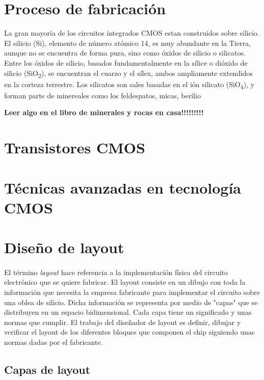\documentclass[12pt,a4paper,oneside,titlepage]{report}
\begin{document}
\section{Proceso de fabricación}

La gran mayoría de los circuitos integrados CMOS estan construidos sobre silicio.
El silicio (Si), elemento de número atómico 14, es muy abundante en la Tierra, aunque
no se encuentra de forma pura, sino como óxidos de silicio o silicatos. Entre los
óxidos de silicio, basados fundamentalmente en la sílice o dióxido de silicio
(SiO\textsubscript{2}), se encuentran el cuarzo y el sílex, ambos ampliamente extendidos
en la corteza terrestre. Los silicatos son sales basadas en el ión silicato (SiO\textsubscript{4}),
y forman parte de minereales como los feldespatos, micas, berilio

\huge{\textbf{Leer algo en el libro de minerales y rocas en casa!!!!!!!!!}}

\section{Transistores CMOS}

\section{Técnicas avanzadas en tecnología CMOS}

\section{Diseño de layout}

\paragraph{}
El término \textit{layout} hace referencia a la implementación física del circuito
electrónico que se quiere fabricar. El layout consiste en un dibujo con toda
la información que necesita la empresa fabricante para implementar el circuito
sobre una oblea de silicio. Dicha información se representa por medio de "capas"
que se distribuyen en un espacio bidimensional. Cada capa tiene un significado y
unas normas que cumplir. El trabajo del diseñador de layout es definir, dibujar y
verificar el layout de los diferentes bloques que componen el chip siguiendo
unas normas dadas por el fabricante.

\subsection{Capas de layout}
\end{document}
